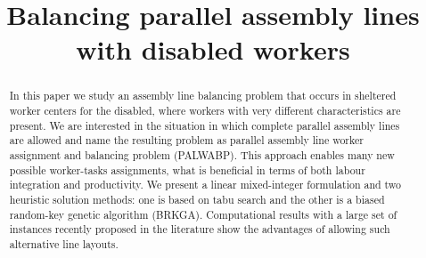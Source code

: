 \documentclass{singlecol-new}
\begin{document}
\setcounter{page}{1}






\BottomCatch




\subtitle{}

\title{Balancing parallel assembly lines with disabled workers}




\begin{abstract}
In this paper we study an assembly line balancing problem that occurs in sheltered worker centers for the disabled, where workers with very different characteristics are present. We are interested in the situation in which complete parallel assembly lines are allowed and name the resulting problem as parallel assembly line worker assignment and balancing problem (PALWABP). This approach enables many new possible worker-tasks assignments, what is beneficial in terms of both labour integration and productivity. We present a linear mixed-integer formulation and two heuristic solution methods: one is based on tabu search and the other is a biased random-key genetic algorithm (BRKGA). Computational results with a large set of instances recently proposed in the literature show the advantages of allowing such alternative line layouts. 
\end{abstract}
\end{document}
